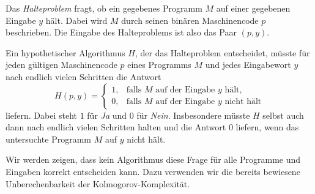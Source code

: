 \begin{mydefinition}[Halteproblem]\label{mydefinition:halteproblem}
	Das \emph{Halteproblem} fragt, ob ein gegebenes Programm $M$ auf einer gegebenen Eingabe $y$ hält. Dabei wird $M$ durch seinen binären Maschinencode $p$ beschrieben. Die Eingabe des Halteproblems ist also das Paar $(p,y)$.

	Ein hypothetischer Algorithmus $H$, der das Halteproblem entscheidet, müsste für jeden gültigen Maschinencode $p$ eines Programms $M$ und jedes Eingabewort $y$ nach endlich vielen Schritten die Antwort
	\[
		H(p,y)=
		\begin{cases}
			1, & \text{falls } M \text{ auf der Eingabe } y \text{ hält},\\
			0, & \text{falls } M \text{ auf der Eingabe } y \text{ nicht hält}
		\end{cases}
	\]
	liefern. Dabei steht $1$ für \emph{Ja} und $0$ für \emph{Nein}. Insbesondere müsste $H$ selbst auch dann nach endlich vielen Schritten halten und die Antwort $0$ liefern, wenn das untersuchte Programm $M$ auf $y$ nicht hält.
\end{mydefinition}

Wir werden zeigen, dass kein Algorithmus diese Frage für alle Programme und Eingaben korrekt entscheiden kann. Dazu verwenden wir die bereits bewiesene Unberechenbarkeit der Kolmogorov-Komplexität.


